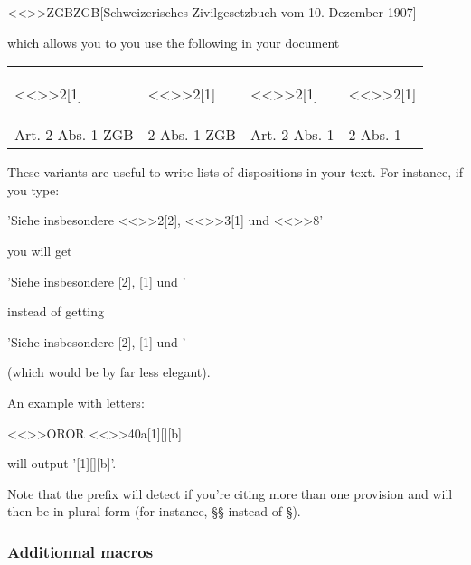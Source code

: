 \documentclass[a4paper]{ltxdockit}[2011/03/25]
\begin{document}
\begin{ltxcode}
<<\DeclareLex>>{ZGB}{ZGB}[Schweizerisches Zivilgesetzbuch vom 10. Dezember 1907]
\end{ltxcode} 

which allows you to you use the following in your document

\begin{tabular}{llll}
\begin{ltxcode}
<<\ZGB>>{2}[1]
\end{ltxcode} 
&
\begin{ltxcode}
<<\npZGB>>{2}[1]
\end{ltxcode} 
&
\begin{ltxcode}
<<\ZGBns>>{2}[1]
\end{ltxcode}
&
\begin{ltxcode}
<<\npZGBns>>{2}[1]
\end{ltxcode}  
\\
Art. 2 Abs. 1 ZGB
&
2 Abs. 1 ZGB
&
Art. 2 Abs. 1
&
2 Abs. 1
\end{tabular}

These variants are useful to write lists of dispositions in your text. For instance, if you type:

\begin{ltxcode}
'Siehe insbesondere <<\ZGBns>>{2}[2], <<\npZGBns>>{3}[1] und <<\npZGB>>{8}'
\end{ltxcode} 

you will get

'Siehe insbesondere [2], [1] und '

instead of getting

'Siehe insbesondere [2], [1] und '

(which would be by far less elegant).

An example with letters:

\begin{ltxcode}
<<\DeclareLex>>{OR}{OR}
<<\OR>>{40a}[1][][b]
\end{ltxcode} 


will output '[1][][b]'.

 Note that the prefix will detect if you're citing more than one provision and will then be in plural form (for instance, \S\S {} instead of \S).

\subsubsection{Additionnal macros}
\end{document}
